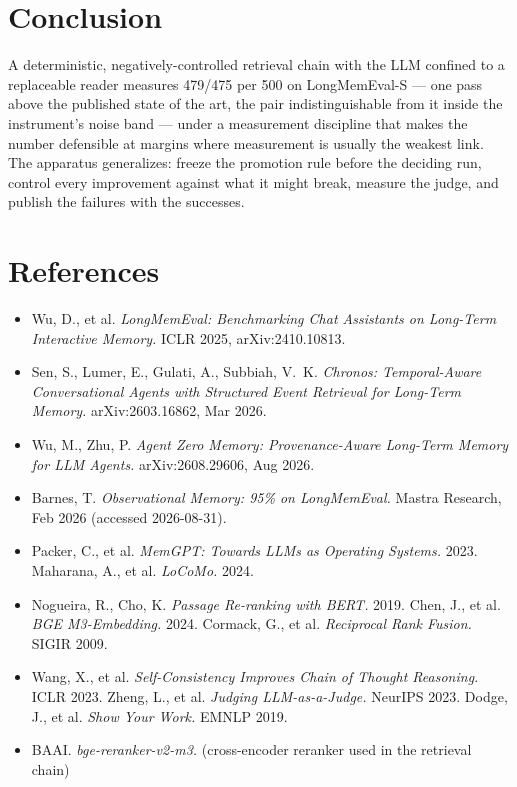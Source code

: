 \documentclass[11pt]{article}
\begin{document}
\section{Conclusion}
A deterministic, negatively-controlled retrieval chain with the LLM confined
to a replaceable reader measures 479/475 per 500 on LongMemEval-S --- one pass
above the published state of the art, the pair indistinguishable from it inside
the instrument's noise band --- under a measurement discipline that makes the number defensible at margins where
measurement is usually the weakest link. The apparatus generalizes: freeze the
promotion rule before the deciding run, control every improvement against what
it might break, measure the judge, and publish the failures with the
successes.

\section*{References}
\begin{itemize}\setlength{\itemsep}{1pt}\setlength{\parskip}{0pt}\setlength{\parsep}{0pt}
\item Wu, D., et al. \emph{LongMemEval: Benchmarking Chat Assistants on
Long-Term Interactive Memory.} ICLR 2025, arXiv:2410.10813.
\item Sen, S., Lumer, E., Gulati, A., Subbiah, V.~K. \emph{Chronos:
Temporal-Aware Conversational Agents with Structured Event Retrieval for
Long-Term Memory.} arXiv:2603.16862, Mar 2026.
\item Wu, M., Zhu, P. \emph{Agent Zero Memory: Provenance-Aware Long-Term
Memory for LLM Agents.} arXiv:2608.29606, Aug 2026.
\item Barnes, T. \emph{Observational Memory: 95\% on LongMemEval.} Mastra
Research, Feb 2026 (accessed 2026-08-31).
\item Packer, C., et al. \emph{MemGPT: Towards LLMs as Operating Systems.}
2023. \quad Maharana, A., et al. \emph{LoCoMo.} 2024.
\item Nogueira, R., Cho, K. \emph{Passage Re-ranking with BERT.} 2019. \quad
Chen, J., et al. \emph{BGE M3-Embedding.} 2024. \quad Cormack, G., et al.
\emph{Reciprocal Rank Fusion.} SIGIR 2009.
\item Wang, X., et al. \emph{Self-Consistency Improves Chain of Thought
Reasoning.} ICLR 2023. \quad Zheng, L., et al. \emph{Judging LLM-as-a-Judge.}
NeurIPS 2023. \quad Dodge, J., et al. \emph{Show Your Work.} EMNLP 2019.
\item BAAI. \emph{bge-reranker-v2-m3.} (cross-encoder reranker used in the
retrieval chain)
\end{itemize}
\end{document}
